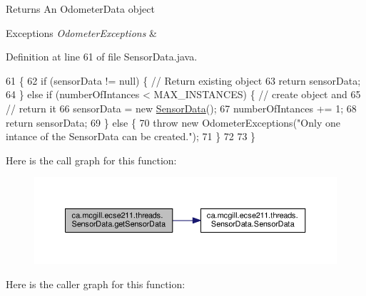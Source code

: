 \begin{DoxyReturn}{Returns}
An Odometer\+Data object 
\end{DoxyReturn}

\begin{DoxyExceptions}{Exceptions}
{\em Odometer\+Exceptions} & \\
\hline
\end{DoxyExceptions}


Definition at line 61 of file Sensor\+Data.\+java.


\begin{DoxyCode}
61                                                                                   \{
62     \textcolor{keywordflow}{if} (sensorData != null) \{ \textcolor{comment}{// Return existing object}
63       \textcolor{keywordflow}{return} sensorData;
64     \} \textcolor{keywordflow}{else} \textcolor{keywordflow}{if} (numberOfIntances < MAX\_INSTANCES) \{ \textcolor{comment}{// create object and}
65                                                    \textcolor{comment}{// return it}
66       sensorData = \textcolor{keyword}{new} \hyperlink{classca_1_1mcgill_1_1ecse211_1_1threads_1_1_sensor_data_a11dcdc9c15184e05a9c84fc3958e26b6}{SensorData}();
67       numberOfIntances += 1;
68       \textcolor{keywordflow}{return} sensorData;
69     \} \textcolor{keywordflow}{else} \{
70       \textcolor{keywordflow}{throw} \textcolor{keyword}{new} OdometerExceptions(\textcolor{stringliteral}{"Only one intance of the SensorData can be created."});
71     \}
72 
73   \}
\end{DoxyCode}
Here is the call graph for this function\+:
\nopagebreak
\begin{figure}[H]
\begin{center}
\leavevmode
\includegraphics[width=350pt]{classca_1_1mcgill_1_1ecse211_1_1threads_1_1_sensor_data_a8260aba53b4474ca1275e4ce26157977_cgraph}
\end{center}
\end{figure}
Here is the caller graph for this function\+:
\nopagebreak
